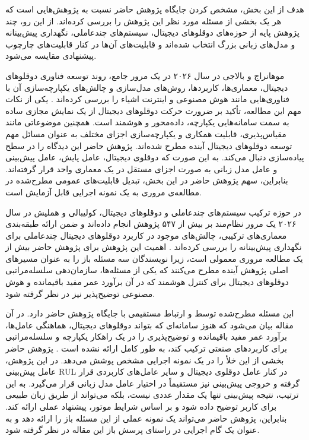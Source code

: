 هدف از این بخش، مشخص کردن جایگاه پژوهش حاضر نسبت به پژوهش‌هایی است که هر یک بخشی از مسئله مورد نظر این پژوهش را بررسی کرده‌اند. از این رو، چند پژوهش پایه از حوزه‌های دوقلوهای دیجیتال، سیستم‌های چندعاملی، نگهداری پیش‌بینانه و مدل‌های زبانی بزرگ انتخاب شده‌اند و قابلیت‌های آن‌ها در کنار قابلیت‌های چارچوب پیشنهادی مقایسه می‌شود.

موهانراج
 و
بالاجی
در سال ۲۰۲۶ در یک مرور جامع، روند توسعه فناوری
دوقلوهای دیجیتال، معماری‌ها، کاربردها، روش‌های مدل‌سازی و چالش‌های
یکپارچه‌سازی آن با فناوری‌هایی مانند هوش مصنوعی و اینترنت اشیاء را
بررسی کرده‌اند \cite{mohanraj2026digitaltwin}. یکی از نکات مهم این
مطالعه، تأکید بر ضرورت حرکت دوقلوهای دیجیتال از یک نمایش مجازی ساده به
سمت سامانه‌هایی یکپارچه، داده‌محور و هوشمند است. همچنین موضوعاتی مانند
مقیاس‌پذیری، قابلیت همکاری و یکپارچه‌سازی اجزای مختلف به عنوان مسائل
مهم توسعه دوقلوهای دیجیتال آینده مطرح شده‌اند. پژوهش حاضر این دیدگاه
را در سطح پیاده‌سازی دنبال می‌کند. به این صورت که دوقلوی دیجیتال،
عامل پایش، عامل پیش‌بینی و عامل مدل زبانی به صورت اجزای مستقل در یک معماری واحد قرار گرفته‌اند. بنابراین، سهم پژوهش حاضر
در این بخش، تبدیل قابلیت‌های عمومی مطرح‌شده در مطالعه‌ی مروری به یک
نمونه اجرایی قابل آزمایش است.

در حوزه ترکیب سیستم‌های چندعاملی و دوقلوهای دیجیتال،
کولیبالی
و
هملیش
در سال ۲۰۲۶ یک مرور نظام‌مند بر بیش از ۵۴۷ پژوهش انجام داده‌اند
و ضمن ارائه طبقه‌بندی معماری‌های ترکیبی، چالش‌های موجود در کاربرد
دوقلوهای دیجیتال چندعاملی برای نگهداری پیش‌بینانه را بررسی کرده‌اند
\cite{coulibaly2026madtdt}. اهمیت این پژوهش برای پژوهش حاضر
بیش از یک مطالعه مروری معمولی است، زیرا نویسندگان سه مسئله باز را به
عنوان مسیرهای اصلی پژوهش آینده مطرح می‌کنند که یکی از مسئله‌ها، سازمان‌دهی سلسله‌مراتبی دوقلوهای دیجیتال برای کنترل هوشمند که در آن برآورد عمر مفید باقیمانده و هوش مصنوعی توضیح‌پذیر نیز در نظر گرفته شود.

این مسئله مطرح‌شده توسط 
و
ارتباط مستقیمی با جایگاه
پژوهش حاضر دارد. در آن مقاله بیان می‌شود که هنوز سامانه‌ای که بتواند
دوقلوهای دیجیتال، هماهنگی عامل‌ها، برآورد عمر مفید باقیمانده و
توضیح‌پذیری را در یک راهکار یکپارچه و سلسله‌مراتبی برای کاربردهای
صنعتی ترکیب کند، به طور کامل ارائه نشده است
\cite{coulibaly2026madtdt}. پژوهش حاضر بخشی از این خلأ را در یک
نمونه اجرایی مشخص پوشش می‌دهد. در این پژوهش، عامل پیش‌بینی \gls{RUL} در
کنار عامل دوقلوی دیجیتال و سایر عامل‌های کاربردی قرار گرفته و خروجی
پیش‌بینی نیز مستقیماً در اختیار عامل مدل زبانی قرار می‌گیرد. به این
ترتیب، نتیجه پیش‌بینی تنها یک مقدار عددی نیست، بلکه می‌تواند از طریق زبان طبیعی برای کاربر توضیح داده شود و بر اساس شرایط موتور، پیشنهاد عملی ارائه کند. بنابراین، پژوهش حاضر می‌تواند یک نمونه عملی از این مسئله باز را ارائه دهد و به عنوان یک گام اجرایی در راستای پرسش باز این مقاله در نظر گرفته شود.


